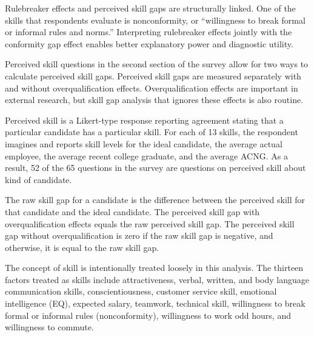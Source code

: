 \documentclass[review]{elsarticle}
\begin{document}
Rulebreaker effects and perceived skill gaps are structurally linked.
One of the skills that respondents evaluate is nonconformity, or ``willingness to break formal or informal rules and norms.''
Interpreting rulebreaker effects jointly with the conformity gap effect
enables better explanatory power and diagnostic utility.

Perceived skill questions in the second section of the survey allow for two ways to calculate perceived skill gaps.
Perceived skill gaps are measured separately with and without overqualification effects.
Overqualification effects are important in external research\cite{green2007there, raybould2005over}, but skill gap analysis that ignores these effects is also routine\cite{blake_2018}.

Perceived skill is a Likert-type response reporting agreement stating that a particular candidate has a particular skill.
For each of 13 skills, the respondent imagines and reports skill levels for the ideal candidate,
the average actual employee,
the average recent college graduate,
and the average ACNG.
As a result, 52 of the 65 questions in the survey are questions on perceived skill about kind of candidate.

The raw skill gap for a candidate is the difference between the perceived skill for that candidate and the ideal candidate.
The perceived skill gap with overqualification effects equals the raw perceived skill gap.
The perceived skill gap without overqualification is zero if the raw skill gap is negative,
and otherwise, it is equal to the raw skill gap.

The concept of skill is intentionally treated loosely in this analysis.
The thirteen factors treated as skills include
attractiveness,
verbal, written, and body language communication skills,
conscientiousness,
customer service skill,
emotional intelligence (EQ),
expected salary,
teamwork,
technical skill,
willingness to break formal or informal rules (nonconformity),
willingness to work odd hours,
and willingness to commute.
\end{document}
